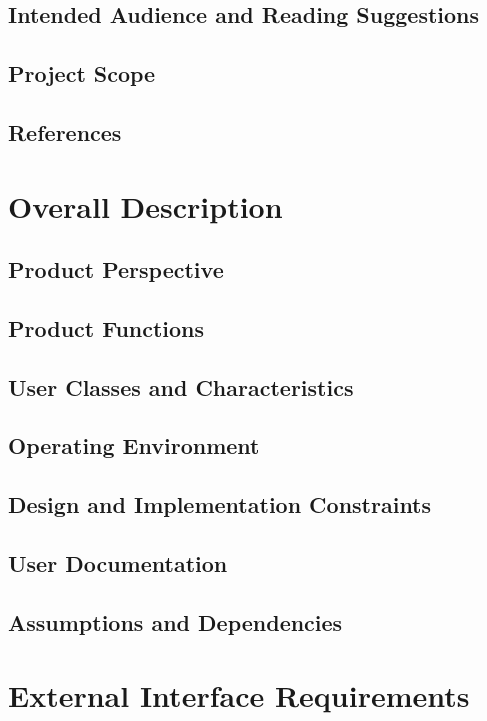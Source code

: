 \documentclass{scrreprt}
\begin{document}
\section{Intended Audience and Reading Suggestions}

\section{Project Scope}
\section{References}


\chapter{Overall Description}

\section{Product Perspective}
\section{Product Functions}

\section{User Classes and Characteristics}

\section{Operating Environment}




\section{Design and Implementation Constraints}

\section{User Documentation}
\section{Assumptions and Dependencies}

\chapter{External Interface Requirements}
\end{document}
